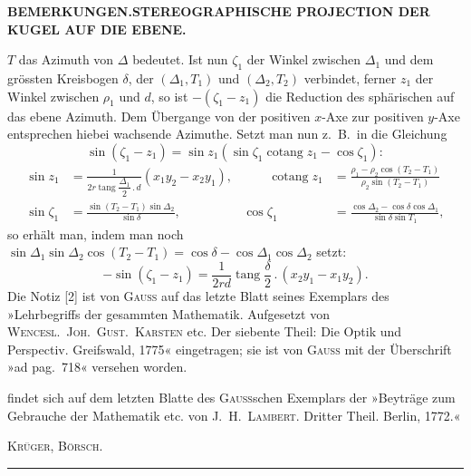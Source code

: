 \begingroup
\setlength{\abovedisplayskip}{7pt}
\setlength{\belowdisplayskip}{7pt}
\setlength{\abovedisplayshortskip}{3pt}
\setlength{\belowdisplayshortskip}{4pt}

\par\clearpage
\noindent{}\hfill{\fontsize{8}{10}\selectfont\textbf{BEMERKUNGEN.\quad STEREOGRAPHISCHE PROJECTION DER KUGEL AUF DIE EBENE.}}\hfill\null\par\medskip

{\small
\noindent \(T\) das Azimuth von \(\Delta\) bedeutet. Ist nun \(\zeta_1\) der Winkel zwischen
\(\Delta_1\) und dem grössten Kreisbogen \(\delta\), der \((\Delta_1,T_1)\) und
\((\Delta_2,T_2)\) verbindet, ferner \(z_1\) der Winkel zwischen \(\rho_1\) und \(d\),
so ist \(-(\zeta_1-z_1)\) die Reduction des sphärischen auf das ebene Azimuth.
Dem Übergange von der positiven \(x\)-Axe zur positiven \(y\)-Axe entsprechen hiebei
wachsende Azimuthe. Setzt man nun z.\ B.\ in die Gleichung
\[
\sin(\zeta_1-z_1)=\sin z_1(\sin\zeta_1\operatorname{cotang}z_1-\cos\zeta_1):
\]
\[
\begin{alignedat}{2}
\sin z_1&=\frac1{2r\operatorname{tang}\dfrac{\Delta_1}2\,.\,d}(x_1y_2-x_2y_1),
&\qquad\operatorname{cotang}z_1&=\frac{\rho_1-\rho_2\cos(T_2-T_1)}{\rho_2\sin(T_2-T_1)}\\
\sin\zeta_1&=\frac{\sin(T_2-T_1)\sin\Delta_2}{\sin\delta},
&\cos\zeta_1&=\frac{\cos\Delta_2-\cos\delta\cos\Delta_1}{\sin\delta\sin T_1},
\end{alignedat}
\]
\noindent so erhält man, indem man noch
\(\sin\Delta_1\sin\Delta_2\cos(T_2-T_1)=\cos\delta-\cos\Delta_1\cos\Delta_2\) setzt:
\[
-\sin(\zeta_1-z_1)=\frac1{2rd}\operatorname{tang}\frac{\delta}2\,.\,(x_2y_1-x_1y_2).
\]
Die Notiz [2] ist von \textsc{Gauss} auf das letzte Blatt seines Exemplars des
»Lehrbegriffs der gesammten Mathematik. Aufgesetzt von \textsc{Wencesl.\ Joh.\ Gust.\
Karsten} etc. Der siebente Theil: Die Optik und Perspectiv. Greifswald, 1775«
eingetragen; sie ist von \textsc{Gauss} mit der Überschrift »ad pag.\ 718« versehen worden.
\par\noindent [3] findet sich auf dem letzten Blatte des \textsc{Gauss}schen Exemplars
der »Beyträge zum Gebrauche der Mathematik etc. von \textsc{J.\ H.\ Lambert.}
Dritter Theil. Berlin, 1772.«
\par
\noindent\hfill\textsc{Krüger, Börsch.}\hspace*{.06\linewidth}\par}
\vspace{2\baselineskip}
\begin{center}\rule{.24\linewidth}{.4pt}\end{center}

